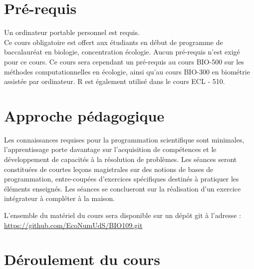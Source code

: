 \documentclass[12]{article}
\begin{document}
	\section*{Pré-requis}

    Un ordinateur portable personnel est requis. \\

	Ce cours obligatoire est offert aux étudiants en début de programme de
	baccalauréat en biologie, concentration écologie. Aucun pré-requis n'est
	exigé pour ce cours. Ce cours sera cependant un pré-requis au cours
	BIO-500 sur les méthodes computationnelles en écologie, ainsi qu'au cours
	BIO-300 en biométrie assistée par ordinateur. R est également utilisé
	dans le cours ECL - 510.

	\section*{Approche pédagogique}

	Les connaissances requises pour la programmation scientifique sont
	minimales, l'apprentissage porte davantage sur l'acquisition de
	compétences et le développement de capacités à la résolution de problèmes.
	Les séances seront constituées de courtes leçons magistrales sur des
	notions de bases de programmation, entre-coupées d'exercices spécifiques
	destinés à pratiquer les éléments enseignés. Les séances se conclueront
	sur la réalisation d'un exercice intégrateur à compléter à la maison.

	L'ensemble du matériel du cours sera disponible sur un dépôt git à l'adresse :\\
	\url{https://github.com/EcoNumUdS/BIO109.git}

	\section*{Déroulement du cours}
\end{document}
